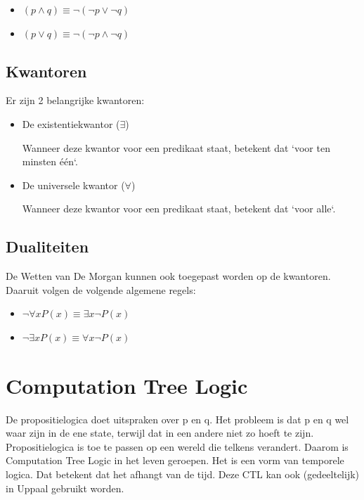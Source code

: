 \documentclass{article}
\begin{document}
		\begin{itemize}
			\item \( (p \land q) \equiv \neg(\neg p \lor \neg q) \)
			\item \( (p \lor q) \equiv \neg(\neg p \land \neg q) \)
		\end{itemize}
		
		\subsection{Kwantoren}
		
		Er zijn 2 belangrijke kwantoren:

		\begin{itemize}
			\item De existentiekwantor (\( \exists \))

			Wanneer deze kwantor voor een predikaat staat, betekent dat `voor ten minsten één`.

			\item De universele kwantor (\( \forall \))

			Wanneer deze kwantor voor een predikaat staat, betekent dat `voor alle`.
		\end{itemize}

		
		\subsection{Dualiteiten}
		
		De Wetten van De Morgan kunnen ook toegepast worden op de kwantoren. Daaruit volgen de volgende algemene regels:

		\begin{itemize}
			\item \( \neg \forall xP(x) \equiv \exists x \neg P(x) \)
			\item \( \neg \exists xP(x) \equiv \forall x \neg P(x) \)
		\end{itemize}
	
	\newpage
	
	
	\section{Computation Tree Logic}
	
	De propositielogica doet uitspraken over p en q. Het probleem is dat p en q wel waar zijn in de ene state, terwijl dat in een andere niet zo hoeft te zijn. Propositielogica is toe te passen op een wereld die telkens verandert. Daarom is Computation Tree Logic in het leven geroepen. Het is een vorm van temporele logica. Dat betekent dat het afhangt van de tijd. Deze CTL kan ook (gedeeltelijk) in Uppaal gebruikt worden.
		
\end{document}
